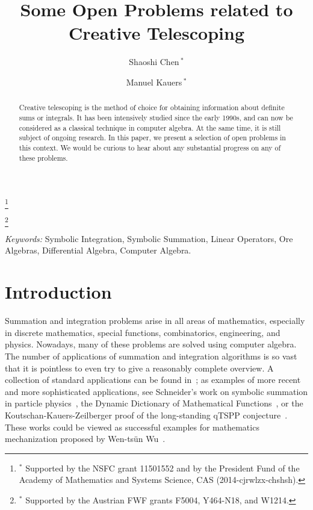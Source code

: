 \documentclass[a4paper,draft]{amsart}
\begin{document}
 \author[Shaoshi Chen]{Shaoshi Chen\,$^\ast$}
 \address{Shaoshi Chen, KLMM, AMSS, Chinese Academy of Sciences, China.}
 \thanks{$^\ast$ Supported by the NSFC grant 11501552 and
   by the President Fund of the Academy of Mathematics and Systems Science, CAS (2014-cjrwlzx-chshsh).}

 \author[Manuel Kauers]{Manuel Kauers\,$^\ast$}
 \address{Manuel Kauers, Institute for Algebra, J. Kepler University Linz, Austria.}
 \thanks{$^\ast$ Supported by the Austrian FWF grants F5004, Y464-N18, and W1214.}

 \title{Some Open Problems related to Creative Telescoping}

 \begin{abstract}
   Creative telescoping is the method of choice for obtaining information about
   definite sums or integrals. It has been intensively studied since the early
   1990s, and can now be considered as a classical technique in computer algebra.
   At the same time, it is still subject of ongoing research. In this paper, we
   present a selection of open problems in this context. We would be curious
   to hear about any substantial progress on any of these problems.
 \end{abstract}

 \maketitle

 \emph{Keywords:}
 Symbolic Integration,
 Symbolic Summation,
 Linear Operators,
 Ore Algebras,
 Differential Algebra,
 Computer Algebra.

 \section{Introduction}

 Summation and integration problems arise in all areas of mathematics,
 especially in discrete mathematics, special functions, combinatorics,
 engineering, and physics.  Nowadays, many of these problems are solved using
 computer algebra. The number of applications of summation and integration
 algorithms is so vast that it is pointless to even try to give a reasonably
 complete overview. A collection of standard applications can be found
 in~\cite{nemes97,kauers10j}; as examples of more recent and more sophisticated
 applications, see Schneider's work on symbolic summation in particle
 physics~\cite{schneider16}, the Dynamic Dictionary of Mathematical
 Functions~\cite{benoit10}, or the Koutschan-Kauers-Zeilberger proof of the
 long-standing qTSPP conjecture~\cite{koutschan10a}.  These works
 could be viewed as successful examples for mathematics mechanization
 proposed by Wen-ts\"un Wu~\cite{WuGao2007}.
\end{document}
